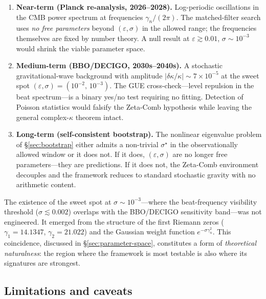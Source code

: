 \documentclass[12pt,a4paper]{article}
\begin{document}
\begin{enumerate}
  \item \textbf{Near-term (Planck re-analysis, 2026--2028).}
    Log-periodic oscillations in the CMB power spectrum at
    frequencies $\gamma_{n}\!/\!(2\pi)$.
    The matched-filter search uses \emph{no free parameters}
    beyond $(\varepsilon,\sigma)$ in the allowed range; the
    frequencies themselves are fixed by number theory.
    A null result at $\varepsilon \gtrsim 0.01$,
    $\sigma \sim 10^{-3}$ would shrink the viable parameter
    space.

  \item \textbf{Medium-term (BBO/DECIGO, 2030s--2040s).}
    A stochastic gravitational-wave background with
    amplitude $|\delta\kappa/\kappa| \sim 7 \times 10^{-5}$
    at the sweet spot
    $(\varepsilon,\sigma) = (10^{-2},\, 10^{-3})$.
    The GUE cross-check---level repulsion in the beat
    spectrum---is a binary yes/no test requiring no fitting.
    Detection of Poisson statistics would falsify the
    Zeta-Comb hypothesis while leaving the general
    complex-$\kappa$ theorem intact.

  \item \textbf{Long-term (self-consistent bootstrap).}
    The nonlinear eigenvalue problem of
    \S\ref{sec:bootstrap} either admits a non-trivial
    $\sigma^{\star}$ in the observationally allowed window
    or it does not.
    If it does, $(\varepsilon,\sigma)$ are no longer free
    parameters---they are predictions.
    If it does not, the Zeta-Comb environment decouples and
    the framework reduces to standard stochastic gravity
    with no arithmetic content.
\end{enumerate}

The existence of the sweet spot at
$\sigma \sim 10^{-3}$---where the beat-frequency visibility
threshold ($\sigma \lesssim 0.002$) overlaps with the
BBO/DECIGO sensitivity band---was not engineered.
It emerged from the structure of the first Riemann zeros
($\gamma_{1} = 14.1347$, $\gamma_{2} = 21.022$) and the
Gaussian weight function $e^{-\sigma\gamma_{n}^{2}}$.
This coincidence, discussed in \S\ref{sec:parameter-space},
constitutes a form of \emph{theoretical naturalness}: the
region where the framework is most testable is also where
its signatures are strongest.


\subsection{Limitations and caveats}
\label{subsec:limitations}
\end{document}

